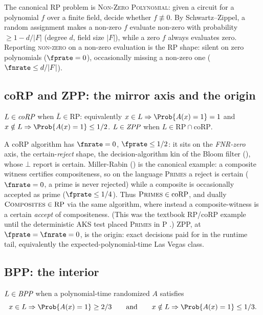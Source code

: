 The canonical RP problem is \textsc{Non-Zero Polynomial}: given a circuit for a
polynomial $f$ over a finite field, decide whether $f \not\equiv 0$. By
Schwartz--Zippel, a random assignment makes a non-zero $f$ evaluate non-zero
with probability $\ge 1 - d/|F|$ (degree $d$, field size $|F|$), while a zero
$f$ always evaluates zero. Reporting \textsc{non-zero} on a non-zero evaluation
is the RP shape: silent on zero polynomials ($\fprate = 0$), occasionally
missing a non-zero one ($\fnrate \le d/|F|$).

\subsection*{coRP and ZPP: the mirror axis and the origin}

\begin{definition}
\label{def:corp}
$L \in \emph{coRP}$ when $\bar L \in \mathrm{RP}$: equivalently $x \in L
\Rightarrow \Prob{A(x) = 1} = 1$ and $x \notin L \Rightarrow \Prob{A(x) = 1} \le
1/2$. \label{def:zpp} $L \in \emph{ZPP}$ when $L \in \mathrm{RP} \cap
\mathrm{coRP}$.
\end{definition}

A coRP algorithm has $\fnrate = 0$, $\fprate \le 1/2$: it sits on the
\emph{FNR-zero} axis, the certain-\emph{reject} shape, the decision-algorithm kin
of the Bloom filter (), whose $\bot$ report is certain.
Miller-Rabin () is the canonical example: a
composite witness certifies compositeness, so on the language \textsc{Primes} a
reject is certain ($\fnrate = 0$, a prime is never rejected) while a composite is
occasionally accepted as prime ($\fprate \le 1/4$). Thus $\textsc{Primes} \in
\mathrm{coRP}$, and dually $\textsc{Composites} \in \mathrm{RP}$ via the same
algorithm, where instead a composite-witness is a certain \emph{accept} of
compositeness. (This was the textbook RP/coRP example until the deterministic
AKS test placed \textsc{Primes} in P \parencite{agrawal-kayal-saxena-2004}.) ZPP, at $\fprate = \fnrate = 0$, is the origin: exact
decisions paid for in the runtime tail, equivalently the expected-polynomial-time
Las Vegas class.

\subsection*{BPP: the interior}

\begin{definition}
\label{def:bpp}
$L \in \emph{BPP}$ when a polynomial-time randomized $A$ satisfies
\[
  x \in L \Rightarrow \Prob{A(x) = 1} \ge 2/3
  \qquad\text{and}\qquad
  x \notin L \Rightarrow \Prob{A(x) = 1} \le 1/3.
\]
\end{definition}

